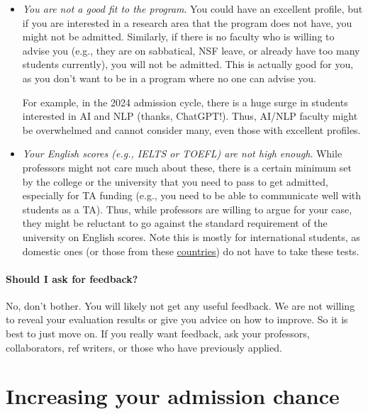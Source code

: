\documentclass[oneside,11pt]{book}
\begin{document}
\begin{itemize}

\item \emph{You are not a good fit to the program}.  You could have an excellent profile, but if you are interested in a research area that the program does not have, you might not be admitted.
Similarly, if there is no faculty who is willing to advise you (e.g., they are on sabbatical, NSF leave, or already have too many students currently), you will not be admitted.  This is actually good for you, as you don't want to be in a program where no one can advise you.

For example, in the 2024 admission cycle, there is a huge surge in students interested in AI and NLP (thanks, ChatGPT!). Thus, AI/NLP faculty might be 
overwhelmed and cannot consider many, even those with excellent profiles.

\item  \emph{Your English scores (e.g., IELTS or TOEFL) are not high enough}.  While professors might not care much about these, there is a certain minimum set by the college or the university that you need to pass to get admitted, especially for TA funding (e.g., you need to be able to communicate well with students as a TA).  Thus, while professors are willing to argue for your case, they might be reluctant to go against the standard requirement of the university on English scores.  Note this is mostly for international students, as domestic ones (or those from these \href{https://github.com/dynaroars/dynaroars.github.io/wiki/About-GMU#standard-tests-waiver-eligible-countries}{countries}) do not have to take these tests.


\end{itemize}

\paragraph{Should I ask for feedback?}
No, don't bother.  You will likely not get any useful feedback.  We are not willing to reveal your evaluation results or give you advice on how to improve. So it is best to just move on.  If you really want feedback, ask your professors, collaborators, ref writers, or those who have previously applied.

\section{Increasing your admission chance}\label{sec:improve-your-chance}
\end{document}
